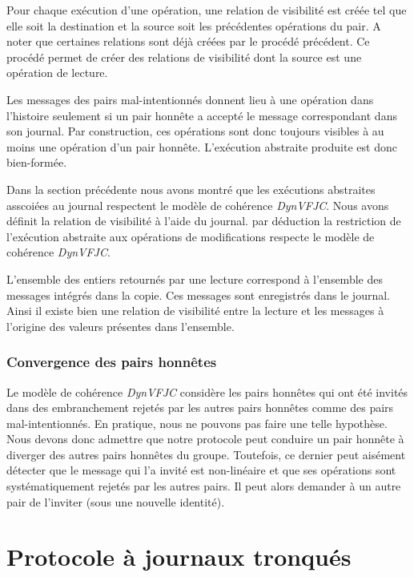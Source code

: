 Pour chaque exécution d'une opération, une relation de visibilité est créée tel que elle soit la destination et la source soit les précédentes opérations du pair.
A noter que certaines relations sont déjà créées par le procédé précédent.
Ce procédé permet de créer des relations de visibilité dont la source est une opération de lecture. 

Les messages des pairs mal-intentionnés donnent lieu à une opération dans l'histoire seulement si un pair honnête a accepté le message correspondant dans son journal.
Par construction, ces opérations sont donc toujours visibles à au moins une opération d'un pair honnête.
L'exécution abstraite produite est donc bien-formée.

Dans la section précédente nous avons montré que les exécutions abstraites asscoiées au journal respectent le modèle de cohérence \emph{DynVFJC}.
Nous avons définit la relation de visibilité à l'aide du journal.
par déduction la restriction de l'exécution abstraite aux opérations de modifications respecte le modèle de cohérence \emph{DynVFJC}.

L'ensemble des entiers retournés par une lecture correspond à l'ensemble des messages intégrés dans la copie. Ces messages sont enregistrés dans le journal.
Ainsi il existe bien une relation de visibilité entre la lecture et les messages à l'origine des valeurs présentes dans l'ensemble.

\subsubsection{Convergence des pairs honnêtes}

Le modèle de cohérence \emph{DynVFJC} considère les pairs honnêtes qui ont été invités dans des embranchement rejetés par les autres pairs honnêtes comme des pairs mal-intentionnés.
En pratique, nous ne pouvons pas faire une telle hypothèse.
Nous devons donc admettre que notre protocole peut conduire un pair honnête à diverger des autres pairs honnêtes du groupe.
Toutefois, ce dernier peut aisément détecter que le message qui l'a invité est non-linéaire et que ses opérations sont systématiquement rejetés par les autres pairs.
Il peut alors demander à un autre pair de l'inviter (sous une nouvelle identité).


\section{Protocole à journaux tronqués}\label{sec:pruned-log-protocol}

